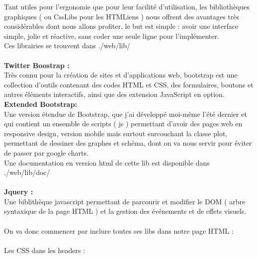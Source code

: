Tant utiles pour l’ergonomie que pour leur facilité d’utilisation, les bibliothèques graphiques ( ou CssLibs pour les HTMLiens ) nous offrent des avantages très considérables dont nous allons profiter, le but est simple : avoir une interface simple, jolie et réactive, sans coder une seule ligne pour l’implémenter.\\
Ces librairies se trouvent dans ./web/lib/\\
\\
\textbf{Twitter Boostrap :}\\
Très connu pour la création de sites et d’applications web, bootstrap est une collection d’outils contenant des codes HTML et CSS, des formulaires, boutons et autres éléments interactifs, ainsi que des extension JavaScript en option.
\\
\textbf{Extended Bootstrap:}\\
Une version étendue de Bootstrap, que j’ai développé moi-même l’été dernier et qui contient un ensemble de scripts ( js ) permettant d’avoir des pages web en responsive design, version mobile mais surtout surcouchant la classe plot, permettant de dessiner des graphes et schéma, dont on va nous servir pour éviter de passer par google charts.\\
Une documentation en version html de cette lib est disponible dans ./web/lib/doc/\\
\\
\textbf{Jquery :}\\
Une biblithèque javascript permettant de parcourir et modifier le DOM ( arbre syntaxique de la page HTML ) et la gestion des événements et de effets visuels.\\
\\
On va donc commencer par inclure toutes ses libs dans notre page HTML :\\
\\
Les CSS dans les headers :\\
